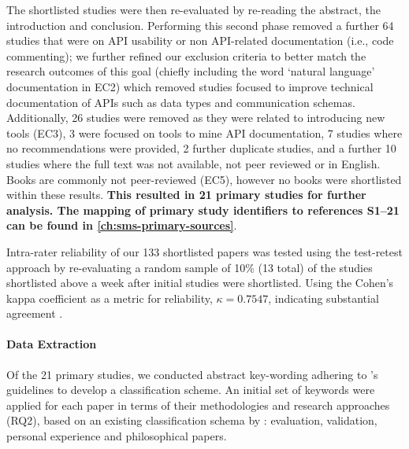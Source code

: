 The shortlisted studies were then re-evaluated by re-reading the abstract, the introduction and conclusion. Performing this second phase removed a further 64 studies that were on API usability or non API-related  documentation (i.e., code commenting); we further refined our exclusion criteria to better match the research outcomes of this goal (chiefly including the word `natural language' documentation in EC2) which removed studies focused to improve technical documentation of APIs such as data types and communication schemas. Additionally, 26 studies were removed as they were related to introducing new tools (EC3), 3 were focused on tools to mine API documentation, 7 studies where no recommendations were provided, 2 further duplicate studies, and a further 10 studies where the full text was not available, not peer reviewed or in English. Books are commonly not peer-reviewed (EC5), however no books were shortlisted within these results. \textbf{This resulted in 21 primary studies for further analysis. The mapping of primary study identifiers to references S1--21 can be found in \cref{ch:sms-primary-sources}}.

Intra-rater reliability of our 133 shortlisted papers was tested using the test-retest approach \citep{Kitchenham:2007dd} by re-evaluating a random sample of 10\% (13 total) of the studies shortlisted above a week after initial studies were shortlisted. Using the Cohen's kappa coefficient as a metric for reliability, $\kappa=0.7547$, indicating substantial agreement \citep{Landis:1977kv}.

\paragraph{Data Extraction}
\label{esem2019:sec:data-extraction}

Of the 21 primary studies, we conducted abstract key-wording adhering to \citeauthor{Petersen:2008td}'s guidelines \citep{Petersen:2008td} to develop a classification scheme.
An initial set of keywords were applied for each paper in terms of their methodologies and research approaches (RQ2), based on an existing classification schema by \citet{Wieringa:2006vd}: evaluation, validation, personal experience and philosophical papers.

